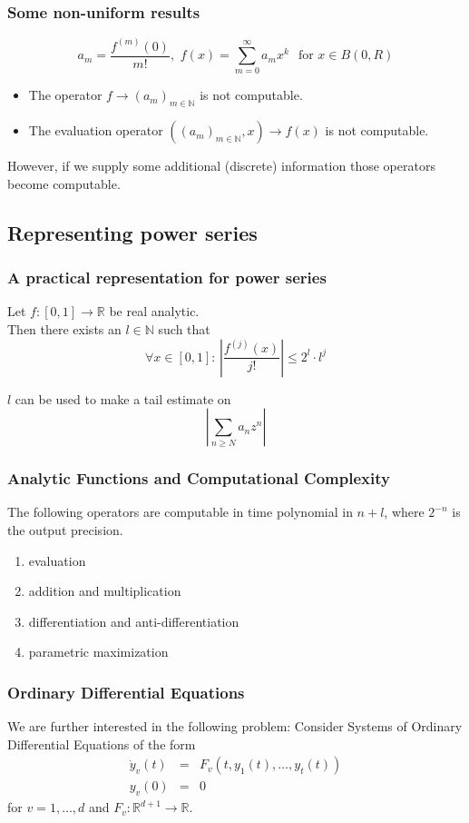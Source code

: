 \documentclass[handout,xcolor=pdftex,dvipsnames,table]{beamer}
\newcommand{\N}{\ensuremath{\mathbb{N}}}
\newcommand{\R}{\ensuremath{\mathbb{R}}}
\newcommand{\RR}{\ensuremath{\mathbb{R}}}
\begin{document}
\begin{frame}
\frametitle{Some non-uniform results}
$$a_m =\frac{f^{(m)}(0)}{m!} 
, \,\, f(x) = \sum_{m=0}^\infty a_mx^k \,\ \text{ for } x \in B(0,R)
$$
\vfill
\begin{theorem}[M\"uller (1995)]
\begin{itemize}
\item The operator $f \to (a_m)_{m \in \N}$ is not computable.
\item The evaluation operator $((a_m)_{m \in \N},x) \to f(x) $ is not computable.
\end{itemize}
\end{theorem}
\pause
However, if we supply some additional (discrete) information those operators become computable.
\end{frame}
\subsection{Representing power series}
\begin{frame}
\frametitle{A practical representation for power series}
\begin{lemma}
  Let $f : [0,1] \to \R$ be real analytic.\\
  Then there exists an $l \in \N$ such that 
  $$ \forall x \in [0,1]: \, \left | \frac{f^{(j)}(x)}{j!} \right | \leq 2^l\cdot l^j $$
\end{lemma}
\pause
$l$ can be used to make a tail estimate on
$$ \left | \sum_{n \geq N} a_n z^n \right |  $$
\end{frame}
\begin{frame}[<+->]
\frametitle{Analytic Functions and Computational Complexity}
\begin{theorem}
  The following operators are computable in time polynomial in $n+l$, where $2^{-n}$ is the output precision.
\begin{enumerate}
\item evaluation
\item addition and multiplication
\item differentiation and anti-differentiation
\item parametric maximization
\end{enumerate}
\end{theorem}
\end{frame}
\begin{frame}
  \frametitle{Ordinary Differential Equations}
  We are further interested in the following problem:\newline
Consider Systems of Ordinary Differential Equations of the form
\begin{eqnarray*}
  \dot y_v(t) &=& F_v(t, y_1(t), \dots, y_t(t)) \\
  y_v(0) &=& 0 
\end{eqnarray*}
for $v=1,\dots,d$ and $F_v : \RR^{d+1} \to \RR$.
  \end{frame}
\end{document}
